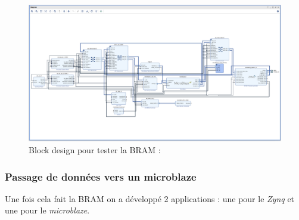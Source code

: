 \documentclass[12pt,a4paper]{ieee}
\begin{document}
\begin{figure}[H]
	\centering
		\includegraphics[width=\linewidth]{im/bram1.png}	
	\caption{Block design pour tester la BRAM :}
	\label{fig-bram1}
\end{figure}


\subsubsection{Passage de données vers un microblaze}
Une fois cela fait la BRAM on a développé 2 applications : une pour le \textit{Zynq} et une pour le \textit{microblaze}.
\end{document}
